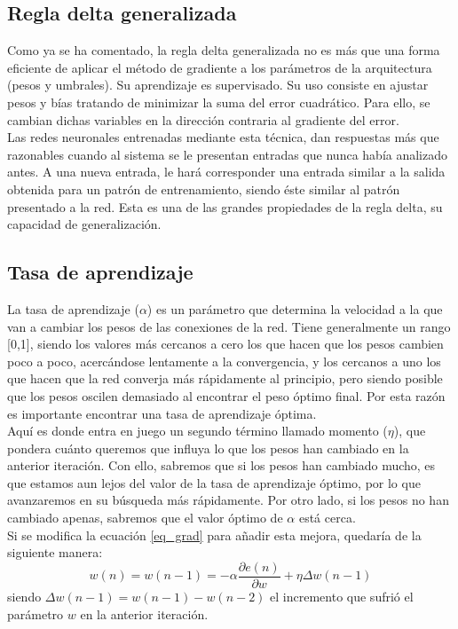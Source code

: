\subsection{Regla delta generalizada} \label{regla_delta}
Como ya se ha comentado, la regla delta generalizada no es más que una forma eficiente de aplicar el método de gradiente a los parámetros de la arquitectura (pesos y umbrales). Su aprendizaje es supervisado. Su uso consiste en ajustar pesos y bías tratando de minimizar la suma del error cuadrático. Para ello, se cambian dichas variables en la dirección contraria al gradiente del error.\\
Las redes neuronales entrenadas mediante esta técnica, dan respuestas más que razonables cuando al sistema se le presentan entradas que nunca había analizado antes. A una nueva entrada, le hará corresponder una entrada similar a la salida obtenida para un patrón de entrenamiento, siendo éste similar al patrón presentado a la red. Esta es una de las grandes propiedades de la regla delta, su capacidad de generalización.\\
\subsection{Tasa de aprendizaje}
La tasa de aprendizaje (${\alpha}$) es un parámetro que determina la velocidad a la que van a cambiar los pesos de las conexiones de la red. Tiene generalmente un rango [0,1], siendo los valores más cercanos a cero los que hacen que los pesos cambien poco a poco, acercándose lentamente a la convergencia, y los cercanos a uno los que hacen que la red converja más rápidamente al principio, pero siendo posible que los pesos oscilen demasiado al encontrar el peso óptimo final. Por esta razón es importante encontrar una tasa de aprendizaje óptima.\\
Aquí es donde entra en juego un segundo término llamado momento (${\eta}$), que pondera cuánto queremos que influya lo que los pesos han cambiado en la anterior iteración. Con ello, sabremos que si los pesos han cambiado mucho, es que estamos aun lejos del valor de la tasa de aprendizaje óptimo, por lo que avanzaremos en su búsqueda más rápidamente. Por otro lado, si los pesos no han cambiado apenas, sabremos que el valor óptimo de ${\alpha}$ está cerca.\\
Si se modifica la ecuación \ref{eq_grad} para añadir esta mejora, quedaría de la siguiente manera:
\begin{equation}
w(n) = w(n-1) = - \alpha \frac{\partial e(n)}{\partial w} + \eta \Delta w(n-1)
\end{equation}
siendo ${\Delta w(n-1)=w(n-1)-w(n-2)}$ el incremento que sufrió el parámetro ${w}$ en la anterior iteración.
